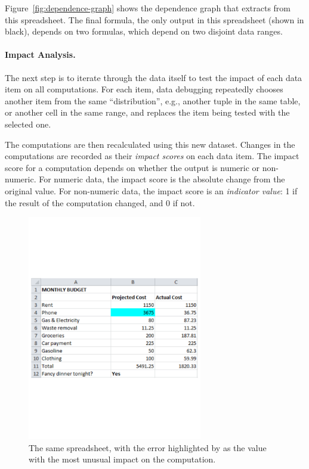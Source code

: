 Figure~\ref{fig:dependence-graph} shows the dependence graph that \checkcell{}
extracts from this spreadsheet. The final formula, the only output in
this spreadsheet (shown in black), depends on two formulas, which depend on two
disjoint data ranges.


\paragraph{Impact Analysis.}
The next step is to iterate through the data itself to test the impact
of each data item on all computations. For each item, data debugging
repeatedly chooses another item from the same ``distribution'', e.g.,
another tuple in the same table, or another cell in the same range,
and replaces the item being tested with the selected one.

The computations are then recalculated using this new dataset. Changes
in the computations are recorded as their \emph{impact scores} on each
data item.  The impact score for a computation depends on whether the
output is numeric or non-numeric. For numeric data, the impact score
is the absolute change from the original value.
For non-numeric data, the impact score is an \emph{indicator value}: 1
if the result of the computation changed, and 0 if not.

\begin{figure}[!t]
\centering
\includegraphics[width=3in]{overview-example-highlighted}
  \caption{The same spreadsheet, with the error highlighted by \checkcell{} as the value with the most unusual impact on the computation.\label{fig:personal_budget_highlighted}}
\end{figure}

